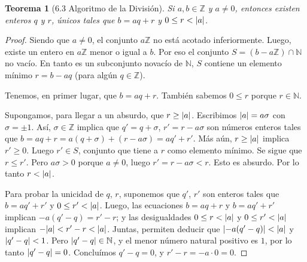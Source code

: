 \documentclass{report}
\newcommand{\naturalNumbers}{\mathbb{N}}
\newcommand{\integerNumbers}{\mathbb{Z}}
\DeclarePairedDelimiter{\abs}{\lvert}{\rvert}
\newtheorem{theorem}{Teorema}
\begin{document}
  \begin{theorem}[6.3 Algoritmo de la División]
    Si \(a, b \in \integerNumbers\) y \(a \neq 0\), entonces existen enteros \(q\) y \(r\), únicos tales que \(b = a q + r\) y 
    \(0 \leq r < \abs{a}\).
  \end{theorem}
  \begin{proof}
    Siendo que \(a \neq 0\), el conjunto \(a \integerNumbers\) no está acotado inferiormente.
    Luego, existe un entero en \(a \integerNumbers\) menor o igual a \(b\).
    Por eso el conjunto \(S = (b - a \integerNumbers) \cap \naturalNumbers\) no vacío.
    En tanto es un subconjunto novacío de \(\naturalNumbers\), \(S\) contiene un elemento mínimo \(r = b - a q\) (para algún \(q \in \integerNumbers\)).

    Tenemos, en primer lugar, que \(b = a q + r\).
    También sabemos \(0 \leq r\) porque \(r \in \naturalNumbers\).

    Supongamos, para llegar a un absurdo, que \(r \geq \abs{a}\).
    Escribimos \(\abs{a} = a \sigma\) con \(\sigma = \pm 1\).
    Así, \(\sigma \in \integerNumbers\) implica que \(q' = q + \sigma\), \(r' = r - a \sigma\) son números enteros tales que \(b = a q + r = a (q + \sigma) + (r - a \sigma) = a q' + r'\).
    Más aún, \(r \geq \abs{a}\) implica \(r' \geq 0\).
    Luego \(r' \in S\), conjunto que tiene a \(r\) como elemento mínimo.
    Se sigue que \(r \leq r'\).
    Pero \(a \sigma > 0\) porque \(a \neq 0\), luego \(r' = r - a \sigma < r\).
    Esto es absurdo.
    Por lo tanto \(r < \abs{a}\).

    Para probar la unicidad de \(q\), \(r\), suponemos que \(q'\), \(r'\) son enteros tales que \(b = a q' + r'\) y \(0 \leq r' < \abs{a}\).
    Luego, las ecuaciones \(b = a q + r\) y \(b = a q' + r'\) implican \(- a (q' - q) = r' - r\); y las desigualdades \(0  \leq r < \abs{a}\) y \(0 \leq r' < \abs{a}\) implican \(- \abs{a} < r' - r < \abs{a}\).
    Juntas, permiten deducir que \(\abs{- a (q' - q)} < \abs{a}\) y \(\abs{q' - q} < 1\).
    Pero \(\abs{q' - q} \in \naturalNumbers\), y el menor número natural positivo es \(1\), por lo tanto \(\abs{q' - q} = 0\).
    Concluímos \(q' - q = 0\), y \(r' - r = - a \cdot 0 = 0\).
  \end{proof}
\end{document}
